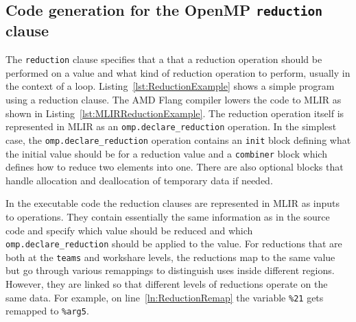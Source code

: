 \documentclass[acmtog,natbib=false]{acmart}
\newcommand{\code}[1]{\texttt{#1}\xspace}
\begin{document}



\subsection{Code generation for the OpenMP \code{reduction} clause}
\label{sec:OpenMPReduction}
The \code{reduction} clause specifies that a that a reduction operation should be performed on a value and what kind of reduction operation to perform, usually in the context of a loop.
Listing~\ref{lst:ReductionExample} shows a simple program using a reduction clause.
The AMD Flang compiler lowers the code to MLIR as shown in Listing~\ref{lst:MLIRReductionExample}.
The reduction operation itself is represented in MLIR as an \code{omp.declare\_reduction} operation.
In the simplest case, the \code{omp.declare\_reduction} operation contains an \code{init} block defining what the initial value should be for a reduction value and a \code{combiner} block which defines how to reduce two elements into one.
There are also optional blocks that handle allocation and deallocation of temporary data if needed.

In the executable code the reduction clauses are represented in \ac{MLIR} as inputs to operations. They contain essentially the same information as in the source code and specify which value should be reduced and which \code{omp.declare\_reduction} should be applied to the value.
For reductions that are both at the \code{teams} and workshare levels, the reductions map to the same value but go through various remappings to distinguish uses inside different regions. However, they are linked so that different levels of reductions operate on the same data. For example, on line~\ref{ln:ReductionRemap} the variable \code{\%21} gets remapped to \code{\%arg5}.
\end{document}
